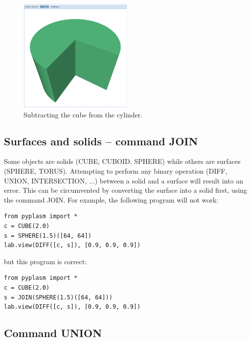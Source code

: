\documentclass[article,A4,12pt]{llncs}
\begin{document}
\begin{figure}[!ht]
\begin{center}
\includegraphics[width=0.5\textwidth]{img/diff-2.png}
\end{center}
\vspace{-2mm}
\caption{Subtracting the cube from the cylinder.}
\label{fig:diff-2}
\end{figure}
\noindent

\subsection{Surfaces and solids -- command JOIN} \label{par:join}

Some objects are solids (CUBE, CUBOID, SPHERE) while others are surfaces (SPHERE, TORUS). 
Attempting to perform any binary operation (DIFF, UNION, INTERSECTION, ...) between
a solid and a surface will result into an error. This can be circumvented by 
converting the surface into a solid first, using the command JOIN. For example,
the following program will not work:

\begin{verbatim}
from pyplasm import *
c = CUBE(2.0)
s = SPHERE(1.5)([64, 64])
lab.view(DIFF([c, s]), [0.9, 0.9, 0.9])
\end{verbatim}
but this program is correct:

\begin{verbatim}
from pyplasm import *
c = CUBE(2.0)
s = JOIN(SPHERE(1.5)([64, 64]))
lab.view(DIFF([c, s]), [0.9, 0.9, 0.9])
\end{verbatim}




\subsection{Command UNION}
\end{document}
